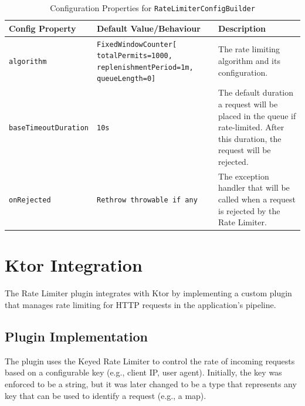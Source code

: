 \begin{table}[!htb]
    \centering
    \caption{Configuration Properties for \texttt{RateLimiterConfigBuilder}}
    \label{tab:ratelimiter-config-builder}
    \vspace{0.3cm}
    \begin{tabular}{|p{5cm}|p{5cm}|p{6cm}|}
        \hline
        \textbf{Config Property} & \textbf{Default Value/Behaviour}                                                       & \textbf{Description}                               \\ \hline
        \texttt{algorithm}       & \texttt{FixedWindowCounter[ totalPermits=1000, replenishmentPeriod=1m, queueLength=0]} & The rate limiting algorithm and its configuration.                                                                                                         \\ \hline
        \texttt{baseTimeoutDuration} & \texttt{10s} & The default duration a request will be placed in the queue
        if rate-limited.
        After this duration, the request will be rejected. \\ \hline
        \texttt{onRejected} & \texttt{Rethrow throwable
        if any} & The exception handler that will be called when a request is rejected by the Rate Limiter. \\ \hline
    \end{tabular}
\end{table}

\resilienceMechanismDefaultConfig


\section{Ktor Integration}\label{sec:rate-limiter-ktor-integration}

The Rate Limiter plugin integrates with Ktor by implementing a custom plugin that manages rate limiting for HTTP requests in the application's pipeline.

\subsection{Plugin Implementation}\label{subsec:rate-limiter-plugin}

The plugin uses the Keyed Rate Limiter to control the rate of incoming requests based on a configurable key
(e.g., client IP, user agent).
Initially, the key was enforced to be a string,
but it was later changed to be a type that represents any key that can be used to identify a request (e.g., a map).


